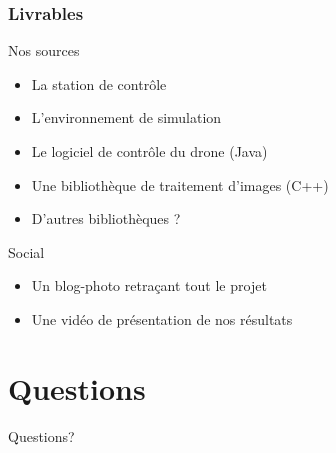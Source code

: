 \documentclass[transparent]{beamer}
\begin{document}
\begin{frame}
\frametitle{Livrables}
	\begin{block}{Nos sources}
			\begin{itemize}
				\item La station de contrôle
				\item L'environnement de simulation
				\item Le logiciel de contrôle du drone (Java)
				\item Une bibliothèque de traitement d'images (C++)
				\item D'autres bibliothèques ?
			\end{itemize}
	\end{block}
	\begin{block}{Social}
			\begin{itemize}
				\item Un blog-photo retraçant tout le projet
				\item Une vidéo de présentation de nos résultats
			\end{itemize}
	\end{block}

\end{frame}

\section{Questions}

\begin{frame}[plain]
\begin{center}
\Huge Questions?
\end{center}
\end{frame} 
\end{document}
